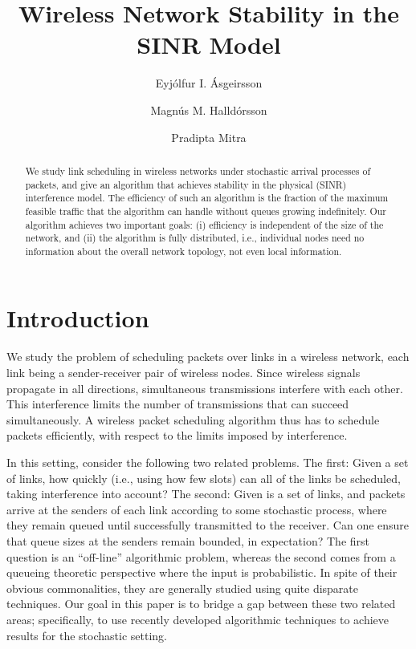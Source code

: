 \documentclass[11pt]{amsart}
\title{Wireless Network Stability in the SINR Model}
\author[E. I.\'Asgeirsson]{Eyj\'olfur I. \'Asgeirsson}
\author[M. M. Halld\'orsson]{Magn\'us M. Halld\'orsson}
\author[P. Mitra]{Pradipta Mitra}
\begin{document}
\begin{abstract}
We study link scheduling in wireless networks under stochastic arrival processes
of packets, and give an algorithm that achieves stability in the
physical (SINR) interference model. The efficiency of such an algorithm is the
fraction of the maximum feasible traffic that the algorithm can handle
without queues growing indefinitely.  
Our algorithm achieves two important goals:
(i) efficiency is independent of the size of the network, and (ii) the
algorithm is fully distributed, i.e., individual nodes need no
information about the overall network topology, not even local
information.
\iffalse
Specifically, we make the following contributions. We design a distributed algorithm that achieves 
-efficiency on all networks (where  is the number of links in the network), for all length-monotone, sublinear
power assignments. In the same setup, we design an alternative distributed algorithm with 
efficiency (where  is the length diversity of the network).
We design a fast centralized algorithm 
with  -efficiency for the power control problem, and a distributed algorithm for the same problem with -efficiency (where  is the length diversity of the link set).
\fi
\end{abstract}



\maketitle 
\section{Introduction}
We study the problem of scheduling packets over links in a wireless network,
each link being a sender-receiver pair of wireless nodes.
Since wireless signals propagate in all directions, simultaneous
transmissions interfere with each other. This interference limits the
number of transmissions that can succeed simultaneously. A wireless
packet scheduling algorithm thus has to schedule packets efficiently,
with respect to the limits imposed by interference.

In this setting, consider the following two related problems. The first: Given a set of links, how quickly (i.e., using how few slots) can all of the links be scheduled, taking interference into account? The second: Given is a set of links, and packets arrive at the senders of each link according to some stochastic process, where they remain queued until successfully transmitted to the receiver. Can one ensure that queue sizes at the senders remain bounded, in expectation? The first question is an ``off-line'' algorithmic problem, whereas the second comes from a queueing theoretic perspective where the input is probabilistic.
In spite of their obvious commonalities, they are generally studied using quite disparate techniques. Our goal in this paper is to bridge a gap between these two related areas; specifically, to use recently developed algorithmic techniques to achieve results for the stochastic setting.
\end{document}
